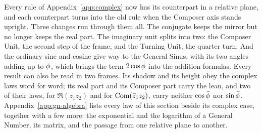 \begin{plainwords}
Every rule of Appendix~\ref{app:complex} now has its counterpart in a relative plane, and each counterpart turns into the old rule when the Composer axis stands upright. Three changes run through them all. The conjugate keeps the mirror but no longer keeps the real part. The imaginary unit splits into two: the Composer Unit, the second step of the frame, and the Turning Unit, the quarter turn. And the ordinary sine and cosine give way to the General Sinus, with its two angles adding up to $\bar{\phi}$, which brings the term $2\cos\bar{\phi}$ into the addition formulas. Every result can also be read in two frames. Its shadow and its height obey the complex laws word for word; its real part and its Composer part carry the lean, and two of their laws, for $\Re(z_1z_2)$ and for $\operatorname{Com}(\bar{z}_1z_2)$, carry neither $\cos\bar{\phi}$ nor $\sin\bar{\phi}$. Appendix~\ref{app:gn-algebra} lists every law of this section beside its complex case, together with a few more: the exponential and the logarithm of a General Number, its matrix, and the passage from one relative plane to another.
\end{plainwords}

